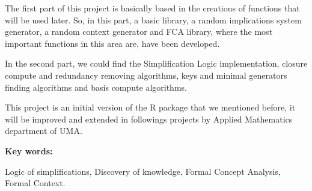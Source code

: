 {The first part of this project 
is basically based in the creations of functions that will be used later. So, in this part, a basic library, a random implications system 
generator, a random context generator and FCA library, where the most important functions in this area are, have been developed. 

In the 
second part, we could find the Simplification Logic implementation, closure compute and redundancy removing algorithms, keys and minimal 
generators finding algorithms and basis compute algorithms. 

This project is an initial version of the R package that we mentioned before, 
it will be improved and extended in followings projects by Applied Mathematics department of UMA.

\bigskip

\textbf{Key words:} 

Logic of simplifications, Discovery of knowledge, 
Formal Concept Analysis, Formal Context.

}
\newpage
\thispagestyle{empty}
\mbox{}
\newpage
